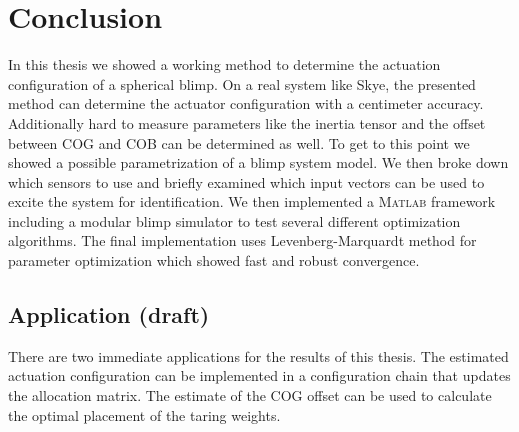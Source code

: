 \chapter{Conclusion}
\label{chap:conclusion}

In this thesis we showed a working method to determine the actuation configuration of a spherical blimp.
On a real system like Skye, the presented method can determine the actuator configuration with a centimeter accuracy.
Additionally hard to measure parameters like the inertia tensor and the offset between COG and COB can be determined as well.
To get to this point we showed a possible parametrization of a blimp system model.
We then broke down which sensors to use and briefly examined which input vectors can be used to excite the system for identification.
We then implemented a \textsc{Matlab} framework including a modular blimp simulator to test several different optimization algorithms.
The final implementation uses Levenberg-Marquardt method for parameter optimization which showed fast and robust convergence.\\



\section{Application (draft)}
There are two immediate applications for the results of this thesis.
The estimated actuation configuration can be implemented in a configuration chain that updates the allocation matrix.
The estimate of the COG offset can be used to calculate the optimal placement of the taring weights.

